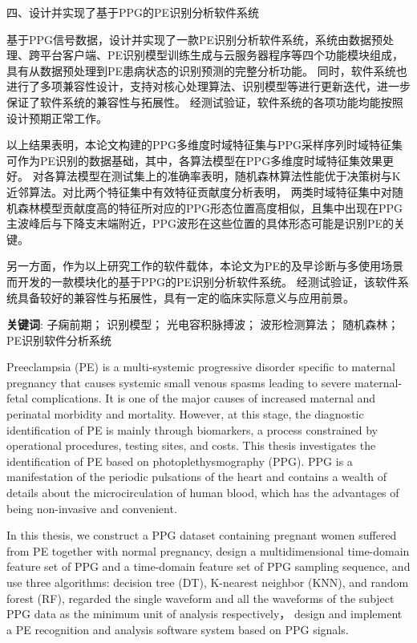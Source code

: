 四、设计并实现了基于PPG的PE识别分析软件系统

基于PPG信号数据，设计并实现了一款PE识别分析软件系统，系统由数据预处理、跨平台客户端、PE识别模型训练生成与云服务器程序等四个功能模块组成，
具有从数据预处理到PE患病状态的识别预测的完整分析功能。
同时，软件系统也进行了多项兼容性设计，支持对核心处理算法、识别模型等进行更新迭代，进一步保证了软件系统的兼容性与拓展性。
经测试验证，软件系统的各项功能均能按照设计预期正常工作。

以上结果表明，本论文构建的PPG多维度时域特征集与PPG采样序列时域特征集可作为PE识别的数据基础，其中，各算法模型在PPG多维度时域特征集效果更好。
对各算法模型在测试集上的准确率表明，随机森林算法性能优于决策树与K近邻算法。对比两个特征集中有效特征贡献度分析表明，
两类时域特征集中对随机森林模型贡献度高的特征所对应的PPG形态位置高度相似，且集中出现在PPG主波峰后与下降支末端附近，PPG波形在这些位置的具体形态可能是识别PE的关键。

另一方面，作为以上研究工作的软件载体，本论文为PE的及早诊断与多使用场景而开发的一款模块化的基于PPG的PE识别分析软件系统。
经测试验证，该软件系统具备较好的兼容性与拓展性，具有一定的临床实际意义与应用前景。

\vspace{2em}

\textbf{关键词}: 子痫前期； 识别模型； 光电容积脉搏波； 波形检测算法； 随机森林；PE识别软件分析系统


\cleardoublepage
{}

Preeclampsia (PE) is a multi-systemic progressive disorder specific to maternal pregnancy that causes systemic small venous spasms 
leading to severe maternal-fetal complications. It is one of the major causes of increased maternal and perinatal morbidity and mortality.  
However, at this stage, the diagnostic identification of PE is mainly through biomarkers, a process constrained by operational procedures, 
testing sites, and costs. 
This thesis investigates the identification of PE based on photoplethysmography (PPG). PPG is a manifestation of the periodic pulsations 
of the heart and contains a wealth of details about the microcirculation of human blood, which has the advantages of being non-invasive and convenient.

In this thesis, we construct a PPG dataset containing pregnant women suffered from PE together with normal pregnancy, design a multidimensional time-domain feature set of PPG and 
a time-domain feature set of PPG sampling sequence, and use three algorithms: decision tree (DT), K-nearest neighbor (KNN), and random forest (RF), 
regarded the single waveform and all the waveforms of the subject PPG data as the minimum unit of analysis respectively， design and implement a PE recognition and analysis software system 
based on PPG signals. 

